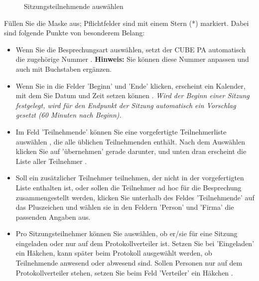 \begin{figure}[H]
\caption{Sitzungsteilnehmende auswählen}
\end{figure}

Füllen Sie die Maske aus; Pflichtfelder sind mit einem Stern (*) markiert. Dabei sind folgende Punkte von besonderem Belang:

\begin{itemize}
\item 
Wenn Sie die Besprechungsart auswählen, setzt der CUBE PA automatisch die zugehörige Nummer . \textbf{Hinweis:} Sie können diese Nummer anpassen und auch mit Buchstaben ergänzen.
\item 
Wenn Sie in die Felder 'Beginn' und 'Ende' klicken, erscheint ein Kalender, mit dem Sie Datum und Zeit setzen können . \textit{Wird der Beginn einer Sitzung festgelegt, wird für den Endpunkt der Sitzung automatisch ein Vorschlag gesetzt (60 Minuten nach Beginn).}
\item 
Im Feld 'Teilnehmende' können Sie eine vorgefertigte Teilnehmerliste auswählen , die alle üblichen Teilnehmenden enthält. Nach dem Auswählen klicken Sie auf 'übernehmen'  gerade darunter, und unten dran erscheint die Liste aller Teilnehmer .
\item 
Soll ein zusätzlicher Teilnehmer teilnehmen, der nicht in der vorgefertigten Liste enthalten ist, oder sollen die Teilnehmer ad hoc für die Besprechung zusammengestellt werden, klicken Sie unterhalb des Feldes 'Teilnehmende' auf das Pluszeichen  und wählen sie in den Feldern 'Person' und 'Firma' die passenden Angaben aus. 
\item
Pro Sitzungsteilnehmer können Sie auswählen, ob er/sie für eine Sitzung eingeladen oder nur auf dem Protokollverteiler ist. Setzen Sie bei 'Eingeladen'  ein Häkchen, kann später beim Protokoll ausgewählt werden, ob Teilnehmende anwesend oder abwesend sind. Sollen Personen nur auf dem Protokollverteiler stehen, setzen Sie beim Feld 'Verteiler' ein Häkchen .


\end{itemize}
